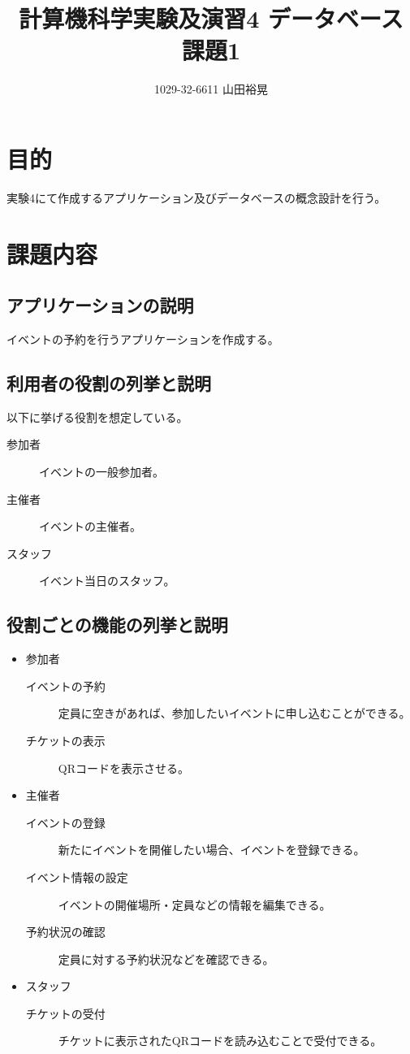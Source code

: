 \documentclass[dvipdfmx]{jarticle}
\begin{document}
\title{計算機科学実験及演習4 データベース 課題1}
\author{1029-32-6611 山田裕晃}
\maketitle

\section{目的}
実験4にて作成するアプリケーション及びデータベースの概念設計を行う。

\section{課題内容}
\subsection{アプリケーションの説明}
イベントの予約を行うアプリケーションを作成する。

\subsection{利用者の役割の列挙と説明}
以下に挙げる役割を想定している。
\begin{description}
    \item[参加者] イベントの一般参加者。
    \item[主催者] イベントの主催者。 
    \item[スタッフ] イベント当日のスタッフ。
\end{description}

\subsection{役割ごとの機能の列挙と説明}
\begin{itemize}
    \item 参加者
    \begin{description}
        \item[イベントの予約] 定員に空きがあれば、参加したいイベントに申し込むことができる。
        \item[チケットの表示] QRコードを表示させる。
    \end{description}
    \item 主催者
    \begin{description}
        \item[イベントの登録] 新たにイベントを開催したい場合、イベントを登録できる。
        \item[イベント情報の設定] イベントの開催場所・定員などの情報を編集できる。
        \item[予約状況の確認] 定員に対する予約状況などを確認できる。
    \end{description}
    \item スタッフ
    \begin{description}
        \item[チケットの受付] チケットに表示されたQRコードを読み込むことで受付できる。
    \end{description}
\end{itemize}
\end{document}
